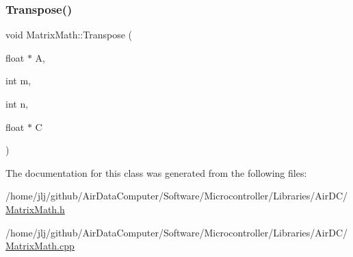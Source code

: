 \mbox{\label{class_matrix_math_aba3cea366ead865747522c2fec0356f5}} 
\subsubsection{\texorpdfstring{Transpose()}{Transpose()}}
{\footnotesize\ttfamily void Matrix\+Math\+::\+Transpose (\begin{DoxyParamCaption}\item[{float $\ast$}]{A,  }\item[{int}]{m,  }\item[{int}]{n,  }\item[{float $\ast$}]{C }\end{DoxyParamCaption})}



The documentation for this class was generated from the following files\+:\begin{DoxyCompactItemize}
\item 
/home/jlj/github/\+Air\+Data\+Computer/\+Software/\+Microcontroller/\+Libraries/\+Air\+D\+C/\hyperlink{_matrix_math_8h}{Matrix\+Math.\+h}\item 
/home/jlj/github/\+Air\+Data\+Computer/\+Software/\+Microcontroller/\+Libraries/\+Air\+D\+C/\hyperlink{_matrix_math_8cpp}{Matrix\+Math.\+cpp}\end{DoxyCompactItemize}
